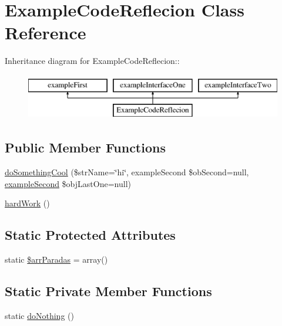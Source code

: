 \hypertarget{class_example_code_reflecion}{
\section{ExampleCodeReflecion Class Reference}
\label{class_example_code_reflecion}
}
Inheritance diagram for ExampleCodeReflecion::\begin{figure}[H]
\begin{center}
\leavevmode
\includegraphics[height=2cm]{class_example_code_reflecion}
\end{center}
\end{figure}
\subsection*{Public Member Functions}
\begin{CompactItemize}
\item 
\hyperlink{class_example_code_reflecion_6b52fd2c25ba4f6c8f14978a7239548b}{doSomethingCool} (\$strName=\char`\"{}hi\char`\"{}, exampleSecond \$obSecond=null, \hyperlink{classexample_second}{exampleSecond} \$objLastOne=null)
\item 
\hyperlink{class_example_code_reflecion_ed906325169515ba52dfaedeee3b54ea}{hardWork} ()
\end{CompactItemize}
\subsection*{Static Protected Attributes}
\begin{CompactItemize}
\item 
static \hyperlink{class_example_code_reflecion_fb7568004be48ac2a4dba7cd994d0f3e}{\$arrParadas} = array()
\end{CompactItemize}
\subsection*{Static Private Member Functions}
\begin{CompactItemize}
\item 
static \hyperlink{class_example_code_reflecion_4b0b162981e21241a43a9c9f8d54e51b}{doNothing} ()
\end{CompactItemize}
